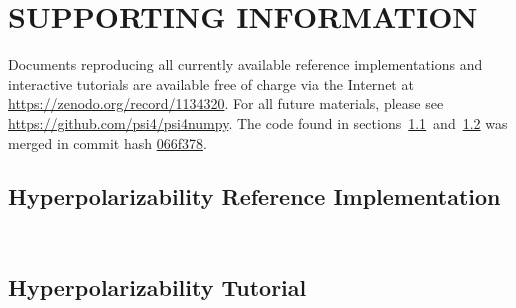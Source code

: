 \documentclass[%
  class = book,%
  crop = false,%
  float = true,%
  multi = true,%
  preview = false,%
]{standalone}
\newcommand{\caps}[1]{\uppercase{#1}}
\begin{document}
\section{\texorpdfstring{\caps{Supporting Information}}{Supporting Information}}

Documents reproducing all currently available reference implementations and interactive tutorials are available free of charge via the Internet at \url{https://zenodo.org/record/1134320}. For all future materials, please see \url{https://github.com/psi4/psi4numpy}. The code found in sections~\ref{paper_05:ssec:hyperpolarizability_reference_implementation}~and~\ref{paper_05:ssec:hyperpolarizability_tutorial} was merged in commit hash \href{https://github.com/psi4/psi4numpy/tree/066f378f26240a4802371ef32849230853581329}{066f378}.

\subsection{Hyperpolarizability Reference Implementation}
\label{paper_05:ssec:hyperpolarizability_reference_implementation}

\begin{singlespace}
\inputminted[escapeinside=||]{python}{\IfStandalone{helper_CPHF.py}{paper_05/helper_CPHF.py}}
\inputminted{python}{\IfStandalone{beta.py}{paper_05/beta.py}}
\end{singlespace}

\subsection{Hyperpolarizability Tutorial}
\label{paper_05:ssec:hyperpolarizability_tutorial}

\providecommand{\tightlist}{%
  \setlength{\itemsep}{0pt}\setlength{\parskip}{0pt}}
\IfStandalone{}{}
\onlyifstandalone{\printbibliography}
\end{document}
